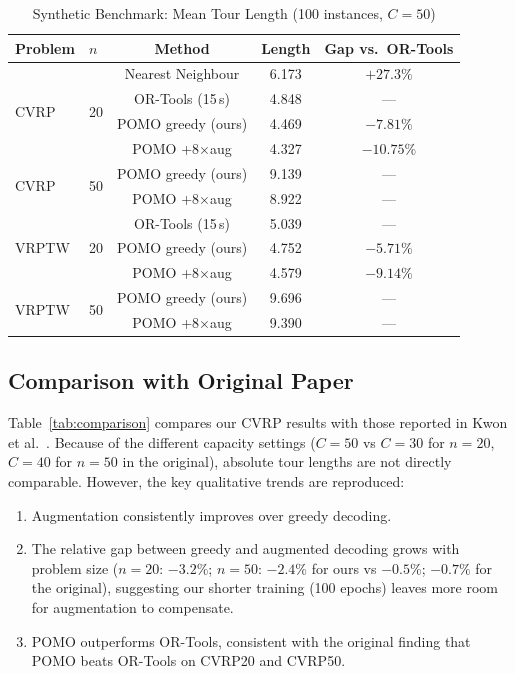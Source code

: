 \documentclass[conference]{IEEEtran}
\begin{document}
\begin{table}[t]
\caption{Synthetic Benchmark: Mean Tour Length (100 instances, $C=50$)}
\label{tab:benchmark}
\centering
\begin{tabular}{llccc}
\toprule
Problem & $n$ & Method & Length & Gap vs.\ OR-Tools \\
\midrule
\multirow{4}{*}{CVRP}
  & \multirow{4}{*}{20}
    & Nearest Neighbour   & 6.173  & $+27.3\%$ \\
  && OR-Tools (15\,s)    & 4.848  & --- \\
  && POMO greedy (ours)  & 4.469  & $-7.81\%$ \\
  && POMO +8$\times$aug  & 4.327  & $-10.75\%$ \\
\midrule
\multirow{2}{*}{CVRP}
  & \multirow{2}{*}{50}
    & POMO greedy (ours)  & 9.139  & --- \\
  && POMO +8$\times$aug  & 8.922  & --- \\
\midrule
\multirow{3}{*}{VRPTW}
  & \multirow{3}{*}{20}
    & OR-Tools (15\,s)   & 5.039  & --- \\
  && POMO greedy (ours)  & 4.752  & $-5.71\%$ \\
  && POMO +8$\times$aug  & 4.579  & $-9.14\%$ \\
\midrule
\multirow{2}{*}{VRPTW}
  & \multirow{2}{*}{50}
    & POMO greedy (ours)  & 9.696  & --- \\
  && POMO +8$\times$aug  & 9.390  & --- \\
\bottomrule
\end{tabular}
\end{table}

\subsection{Comparison with Original Paper}

Table~\ref{tab:comparison} compares our CVRP results with those reported in
Kwon et al.~\cite{kwon2020pomo}. Because of the different capacity settings
($C=50$ vs $C=30$ for $n=20$, $C=40$ for $n=50$ in the original), absolute
tour lengths are not directly comparable. However, the key qualitative
trends are reproduced:

\begin{enumerate}
  \item Augmentation consistently improves over greedy decoding.
  \item The relative gap between greedy and augmented decoding grows with
    problem size ($n=20$: $-3.2\%$; $n=50$: $-2.4\%$ for ours vs $-0.5\%$;
    $-0.7\%$ for the original), suggesting our shorter training (100 epochs)
    leaves more room for augmentation to compensate.
  \item POMO outperforms OR-Tools, consistent with the original finding that
    POMO beats OR-Tools on CVRP20 and CVRP50.
\end{enumerate}
\end{document}
